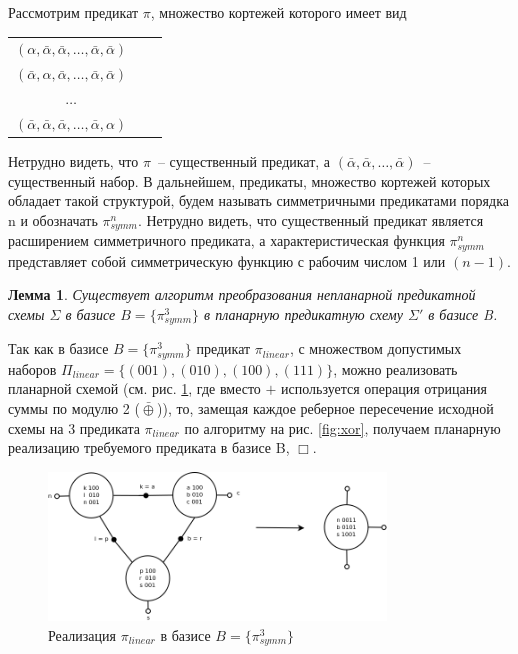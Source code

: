 \documentclass[12pt]{article}
\newtheorem{lemma}[theorem]{Лемма}
\newenvironment{proof}[1][Доказательство]{\begin{trivlist}
\item[\hskip \labelsep {\bfseries #1}]}{\end{trivlist}}
\newenvironment{definition}[1][Определение]{\begin{trivlist}
\item[\hskip \labelsep {\bfseries #1}]}{\end{trivlist}}
\begin{document}
\begin{definition}
Рассмотрим предикат 
$\pi$, множество кортежей которого имеет вид
\begin{center}
\begin{tabular}{ccc}
$(\alpha, \bar{\alpha}, \bar{\alpha}, \dots, \bar{\alpha}, \bar{\alpha})$\\
$(\bar{\alpha}, \alpha, \bar{\alpha}, \dots, \bar{\alpha}, \bar{\alpha})$\\
$\ldots$\\
$(\bar{\alpha}, \bar{\alpha}, \bar{\alpha}, \dots, \bar{\alpha}, \alpha)$
\end{tabular}
\end{center}

Нетрудно видеть, что $\pi$~-- существенный предикат, а
$(\bar{\alpha}, \bar{\alpha}, \dots, \bar{\alpha})$~-- существенный набор. 
В дальнейшем, предикаты, множество кортежей которых обладает такой структурой, будем называть 
симметричными предикатами порядка n и обозначать $\pi_{symm}^n$. Нетрудно видеть, что существенный предикат является 
расширением симметричного предиката, а характеристическая функция $\pi_{symm}^n$ представляет собой симметрическую функцию
с рабочим числом 1 или $(n-1)$.
\end{definition}

\begin{lemma}
\label{eq:planar_algo}
Существует алгоритм преобразования непланарной предикатной схемы $\Sigma$ в базисе $B=\{\pi_{symm}^3\}$
в планарную предикатную схему $\Sigma'$ в базисе B.
\end{lemma}
\begin{proof}
Так как в базисе $B=\{\pi_{symm}^3\}$ предикат 
$\pi_{linear}$, с множеством допустимых наборов $\Pi_{linear} = \{ (001), (010), (100), (111) \}$, 
можно реализовать планарной схемой (см. рис. \ref{fig:linear_3}, где вместо $+$ используется операция
отрицания суммы по модулю 2 ($\bar{\oplus}$)), то, замещая каждое реберное пересечение исходной схемы
на 3 предиката $\pi_{linear}$ по алгоритму на рис. \ref{fig:xor}, получаем планарную реализацию требуемого предиката
в базисе B, $\Box$.
\end{proof}

\begin{figure}[htb]
\centering
\includegraphics[width=0.8\textwidth]{linear.png}
\caption{Реализация $\pi_{linear}$ в базисе $B = \{ \pi_{symm}^3 \}$}
\label{fig:linear_3}
\end{figure}
\end{document}
